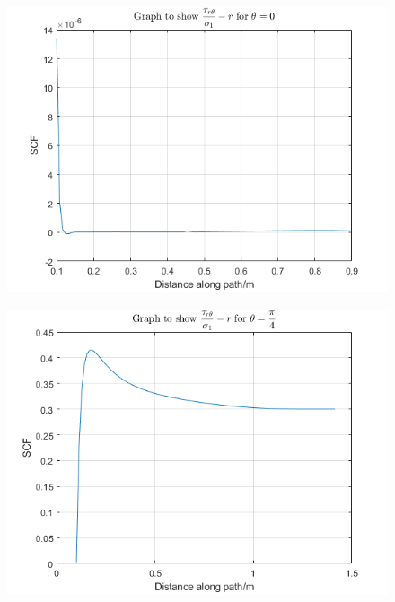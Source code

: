 \documentclass[11pt]{article}
\numberwithin{equation}{section}
\begin{document}
\begin{figure}[H]
    \centering
    \begin{minipage}{.33\textwidth}
      \centering
      \includegraphics[width=\linewidth]{./img/diagram9.png}
      \label{fig:taurtheta0}
    \end{minipage}%
    \begin{minipage}{.33\textwidth}
        \centering
        \includegraphics[width=\linewidth]{./img/diagram10.png}
        \label{fig:taurthetapi4}
      \end{minipage}%

\end{figure}
\end{document}
